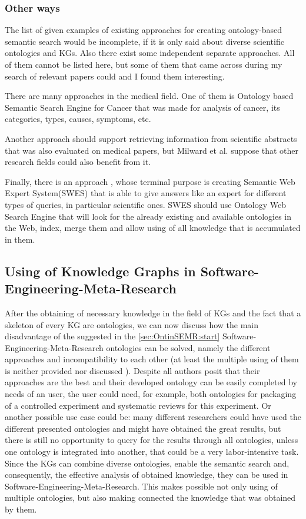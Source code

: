 		\subsubsection{Other ways}
		The list of given examples of existing approaches for creating ontology-based semantic search would be incomplete, if it is only said about diverse scientific ontologies and KGs. Also there exist some independent separate approaches. All of them cannot be listed here, but some of them that came across during my search of relevant papers could and I found them interesting. 
		
		There are many approaches in the medical field. One of them is Ontology based Semantic Search Engine for Cancer\cite{Raj14} that was made for analysis of cancer, its categories, types, causes, symptoms, etc. 
		
		Another approach\cite{Mil05} should support retrieving information from scientific abstracts that was also evaluated on medical papers, but Milward et al. suppose that other research fields could also benefit from it.
		
		Finally, there is an approach \cite{Ver15}, whose terminal purpose is creating Semantic Web Expert System(SWES) that is able to give answers like an expert for different types of queries, in particular scientific ones. SWES should use Ontology Web Search Engine that will look for the already existing and available ontologies in the Web, index, merge them and allow using of all knowledge that is accumulated in them. 
		
		\subsection{Using of Knowledge Graphs in Software-Engineering-Meta-Research}
		After the obtaining of necessary knowledge in the field of KGs and the fact that a skeleton of every KG are ontologies, we can now discuss how the main disadvantage of the suggested in the \autoref{sec:OntinSEMR:start} Software-Engineering-Meta-Research ontologies can be solved, namely the different approaches and incompatibility to each other (at least the multiple using of them is neither provided nor discussed ). Despite all authors posit that their approaches are the best and their developed ontology can be easily completed by needs of an user, the user could need, for example, both ontologies for packaging of a controlled experiment and systematic reviews for this experiment. Or another possible use case could be: many different researchers could have used the different presented ontologies and might have obtained the great results, but there is still no opportunity to query for the results through all ontologies, unless one ontology is integrated into another, that could be a very labor-intensive task. Since the KGs can combine diverse ontologies, enable the semantic search and, consequently, the effective analysis of obtained knowledge, they can be used in Software-Engineering-Meta-Research. This makes possible not only using of multiple ontologies, but also making connected the knowledge that was obtained by them. 
		
